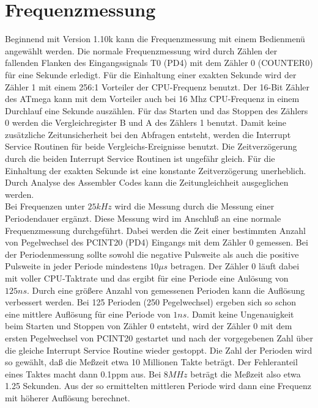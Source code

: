 
\section{Frequenzmessung}
\label{sec:frequency}

Beginnend mit Version 1.10k kann die Frequenzmessung mit einem Bedienmenü angewählt werden.
Die normale Frequenzmessung wird durch Zählen der fallenden Flanken des Eingangssignals T0 (PD4)
mit dem Zähler 0 (COUNTER0) für eine Sekunde erledigt. Für die Einhaltung einer exakten Sekunde
wird der Zähler 1 mit einem 256:1 Vorteiler der CPU-Frequenz benutzt. Der 16-Bit Zähler des ATmega
kann mit dem Vorteiler auch bei 16 Mhz CPU-Frequenz in einem Durchlauf eine Sekunde auszählen.
Für das Starten und das Stoppen des Zählers 0 werden die Vergleichregister B und A des Zählers 1
benutzt. Damit keine zusätzliche Zeitunsicherheit bei den Abfragen entsteht, werden die
Interrupt Service Routinen für beide Vergleichs-Ereignisse benutzt.
Die Zeitverzögerung durch die beiden Interrupt Service Routinen ist ungefähr gleich.
Für die Einhaltung der exakten Sekunde ist eine konstante Zeitverzögerung unerheblich.
Durch Analyse des Assembler Codes kann die Zeitungleichheit ausgeglichen werden.\\

Bei Frequenzen unter \(25 kHz\) wird die Messung durch die Messung einer Periodendauer
ergänzt. Diese Messung wird im Anschluß an eine normale Frequenzmessung durchgeführt.
Dabei werden die Zeit einer bestimmten Anzahl von Pegelwechsel des PCINT20 (PD4) Eingangs
mit dem Zähler 0 gemessen. 
Bei der Periodenmessung sollte sowohl die negative Pulsweite als auch die positive Pulsweite
in jeder Periode mindestens \(10\mu s\) betragen.
Der Zähler 0 läuft dabei mit voller CPU-Taktrate und das ergibt für eine Periode eine
Aulösung von \(125 ns\). Durch eine größere Anzahl von gemessenen Perioden kann die Auflösung
verbessert werden. Bei 125 Perioden (250 Pegelwechsel) ergeben sich so schon eine mittlere
Auflösung für eine Periode von \(1 ns\). Damit keine Ungenauigkeit beim Starten und
Stoppen von Zähler 0 entsteht, wird der Zähler 0 mit dem ersten Pegelwechsel von
PCINT20 gestartet und nach der vorgegebenen Zahl über die gleiche Interrupt Service Routine
wieder gestoppt.
Die Zahl der Perioden wird so gewählt, daß die Meßzeit etwa 10 Millionen Takte beträgt.
Der Fehleranteil eines Taktes macht dann 0.1ppm aus.
Bei \(8MHz\) beträgt die Meßzeit also etwa 1.25 Sekunden.
Aus der so ermittelten mittleren Periode wird dann eine Frequenz mit höherer Auflösung berechnet.

